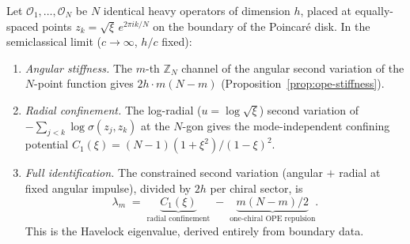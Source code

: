 \begin{theorem}[$\mathbb{Z}_N$ conformal block $=$ Havelock eigenvalue]
\label{thm:block-havelock}
Let $\mathcal{O}_1, \ldots, \mathcal{O}_N$ be $N$ identical heavy
operators of dimension $h$, placed at equally-spaced points
$z_k = \sqrt{\xi}\,e^{2\pi ik/N}$ on the boundary of the
Poincar\'e disk.
In the semiclassical limit ($c \to \infty$, $h/c$ fixed):
\begin{enumerate}
\item[\emph{(a)}] \emph{Angular stiffness.}
  The $m$-th $\mathbb{Z}_N$ channel of the angular second
  variation of the $N$-point function gives
  $2h\cdot m(N{-}m)$
  (Proposition~\ref{prop:ope-stiffness}).
\item[\emph{(b)}] \emph{Radial confinement.}
  The log-radial ($u = \log\!\sqrt{\xi}$) second variation
  of $-\sum_{j<k}\!\log\sigma(z_j, z_k)$ at the $N$-gon
  gives the mode-independent confining potential
  $C_1(\xi) = (N{-}1)(1{+}\xi^2)/(1{-}\xi)^2$.
\item[\emph{(c)}] \emph{Full identification.}
  The constrained second variation
  (angular $+$ radial at fixed angular impulse), divided
  by $2h$ per chiral sector, is
  \begin{equation}\label{eq:block-equals-havelock}
    \lambda_m \;=\;
    \underbrace{C_1(\xi)}_{\text{radial confinement}}
    \;-\;
    \underbrace{m(N{-}m)/2}_{\text{one-chiral OPE repulsion}}.
  \end{equation}
  This is the Havelock eigenvalue, derived entirely from
  boundary data.
\end{enumerate}
\end{theorem}

